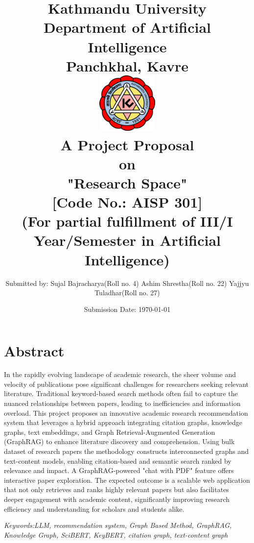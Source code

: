 \documentclass[a4paper,12pt]{article}
\title{
\textbf{
    Kathmandu University \\
    \large{Department of Artificial Intelligence}\\
    \normalsize{Panchkhal, Kavre}\\[1.5cm]}
    \includegraphics[width=3cm]{KU-Logo.png}\\[1cm]
    \normalsize{A Project Proposal\\on\\
    \textbf{"Research Space"}}\\[0.5cm]
    \normalsize{[Code No.: AISP 301]\\
    (For partial fulfillment of III/I Year/Semester in Artificial Intelligence)}\\[1cm]
}
\author[ ]{\normalsize{
        Submitted by: \linebreak
        Sujal Bajracharya(Roll no. 4)\linebreak
        Ashim Shrestha(Roll no. 22)\linebreak
        Yajjyu Tuladhar(Roll no. 27)
}}
\affil[ ]{\vspace{0.3cm}}
\affil[ ]{\normalsize{
        Submitted to: \linebreak
        Subodh Acharya \linebreak
        Department of Artificial Intelligence
}}
\date{\normalsize{Submission Date: \today}}
\begin{document}
\maketitle
\thispagestyle{empty}
\restoregeometry

\newpage
\setcounter{page}{1}

\section*{Abstract}
In the rapidly evolving landscape of academic research, the sheer volume and velocity
of publications pose significant challenges for researchers seeking relevant
literature. Traditional keyword-based search methods often fail to capture the
nuanced relationships between papers, leading to inefficiencies and information
overload. This project proposes an innovative academic research recommendation system
that leverages a hybrid approach integrating citation graphs, knowledge graphs, text
embeddings, and Graph Retrieval-Augmented Generation (GraphRAG) to enhance literature
discovery and comprehension. Using bulk dataset of research papers the methodology
constructs interconnected graphs and text-content models, enabling citation-based and
semantic search ranked by relevance and impact. A GraphRAG-powered "chat with PDF"
feature offers interactive paper exploration. The expected outcome is a scalable web
application that not only retrieves and ranks highly relevant papers but also
facilitates deeper engagement with academic content, significantly improving research
efficiency and understanding for scholars and students alike.

\textit{Keywords:LLM, recommendation system, Graph Based Method, GraphRAG,
Knowledge Graph, SciBERT, KeyBERT, citation graph, text-content graph}
\newpage

\tableofcontents
\newpage

\listoffigures
\newpage
\end{document}
